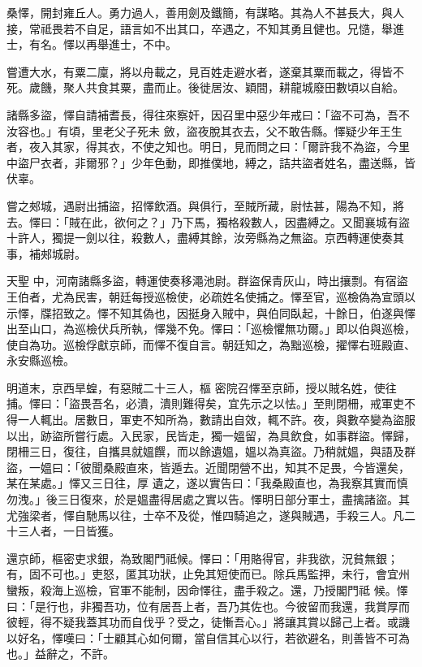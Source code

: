 \begin{pinyinscope}
 桑懌，開封雍丘人。勇力過人，善用劍及鐵簡，有謀略。其為人不甚長大，與人接，常祗畏若不自足，語言如不出其口，卒遇之，不知其勇且健也。兄慥，舉進士，有名。懌以再舉進士，不中。



 嘗遭大水，有粟二廩，將以舟載之，見百姓走避水者，遂棄其粟而載之，得皆不死。歲饑，聚人共食其粟，盡而止。後徙居汝、穎間，耕龍城廢田數頃以自給。



 諸縣多盜，懌自請補耆長，得往來察奸，因召里中惡少年戒曰：「盜不可為，吾不汝容也。」有頃，里老父子死未
 斂，盜夜脫其衣去，父不敢告縣。懌疑少年王生者，夜入其家，得其衣，不使之知也。明日，見而問之曰：「爾許我不為盜，今里中盜尸衣者，非爾邪？」少年色動，即推僕地，縛之，詰共盜者姓名，盡送縣，皆伏辜。



 嘗之郟城，遇尉出捕盜，招懌飲酒。與俱行，至賊所藏，尉怯甚，陽為不知，將去。懌曰：「賊在此，欲何之？」乃下馬，獨格殺數人，因盡縛之。又聞襄城有盜十許人，獨提一劍以往，殺數人，盡縛其餘，汝旁縣為之無盜。京西轉運使奏其事，補郟城尉。



 天聖
 中，河南諸縣多盜，轉運使奏移澠池尉。群盜保青灰山，時出攘剽。有宿盜王伯者，尤為民害，朝廷每授巡檢使，必疏姓名使捕之。懌至官，巡檢偽為宣頭以示懌，牒招致之。懌不知其偽也，因挺身入賊中，與伯同臥起，十餘日，伯遂與懌出至山口，為巡檢伏兵所執，懌幾不免。懌曰：「巡檢懼無功爾。」即以伯與巡檢，使自為功。巡檢俘獻京師，而懌不復自言。朝廷知之，為黜巡檢，擢懌右班殿直、永安縣巡檢。



 明道末，京西旱蝗，有惡賊二十三人，樞
 密院召懌至京師，授以賊名姓，使往捕。懌曰：「盜畏吾名，必潰，潰則難得矣，宜先示之以怯。」至則閉柵，戒軍吏不得一人輒出。居數日，軍吏不知所為，數請出自效，輒不許。夜，與數卒變為盜服以出，跡盜所嘗行處。入民家，民皆走，獨一媼留，為具飲食，如事群盜。懌歸，閉柵三日，復往，自攜具就媼饌，而以餘遺媼，媼以為真盜。乃稍就媼，與語及群盜，一媼曰：「彼聞桑殿直來，皆遁去。近聞閉營不出，知其不足畏，今皆還矣，某在某處。」懌又三日往，厚
 遺之，遂以實告曰：「我桑殿直也，為我察其實而慎勿洩。」後三日復來，於是媼盡得居處之實以告。懌明日部分軍士，盡擒諸盜。其尤強梁者，懌自馳馬以往，士卒不及從，惟四騎追之，遂與賊遇，手殺三人。凡二十三人者，一日皆獲。



 還京師，樞密吏求銀，為致閣門祗候。懌曰：「用賂得官，非我欲，況貧無銀；有，固不可也。」吏怒，匿其功狀，止免其短使而已。除兵馬監押，未行，會宜州蠻叛，殺海上巡檢，官軍不能制，因命懌往，盡手殺之。還，乃授閣門祗
 候。懌曰：「是行也，非獨吾功，位有居吾上者，吾乃其佐也。今彼留而我還，我賞厚而彼輕，得不疑我蓋其功而自伐乎？受之，徒慚吾心。」將讓其賞以歸己上者。或譏以好名，懌嘆曰：「士顧其心如何爾，當自信其心以行，若欲避名，則善皆不可為也。」益辭之，不許。




\end{pinyinscope}
